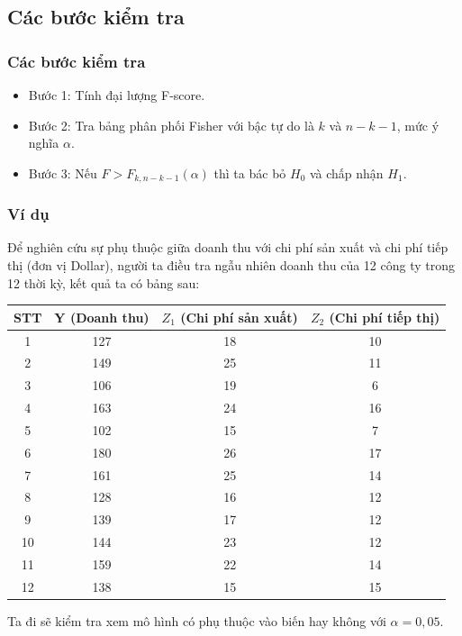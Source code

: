 \subsection{Các bước kiểm tra}
\begin{frame}
\frametitle{Các bước kiểm tra}
\begin{itemize}
 \item Bước 1: Tính đại lượng F-score.
    \item Bước 2: Tra bảng phân phối Fisher với bậc tự do là $k$ và $n-k-1$, mức ý nghĩa $\alpha$.
    \item Bước 3: Nếu $F > F_{k,n-k-1}(\alpha)$ thì ta bác bỏ $H_0$ và chấp nhận $H_1$.
\end{itemize}
\end{frame}
\begin{frame}
\frametitle{Ví dụ}
 Để nghiên cứu sự phụ thuộc giữa doanh thu với chi phí sản xuất và chi phí tiếp thị (đơn vị Dollar), người ta điều
 tra ngẫu nhiên doanh thu của 12 công ty trong 12 thời kỳ, kết quả ta có bảng sau:
     {\scriptsize\begin{center}
            \begin{tabular}{|c|c|c|c|}
	\hline 
	STT & Y (Doanh thu) & $Z_1$ (Chi phí sản xuất) & $Z_2$ (Chi phí tiếp thị) \\
	\hline 
	1& 127 & 18 & 10 \\
      2&  149 & 25 & 11 \\
        3&106 & 19 &6\\
        4&163 & 24 &16\\
        5&102 & 15 &7\\
        6&180 &26 &17\\
        7&161 &25 &14\\
        8&128 &16 &12\\
        9&139 &17 &12\\
        10&144 &23 &12\\
        11&159 &22 &14\\
        12&138 &15 &15\\
	\hline
        
	   \end{tabular}
        \end{center}}
        Ta đi sẽ kiểm tra xem mô hình có phụ thuộc vào biến hay không với $\alpha = 0,05$.
\end{frame}
